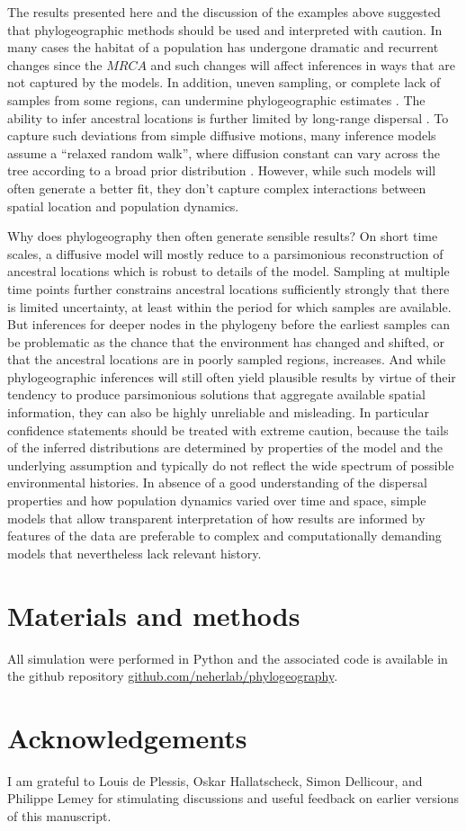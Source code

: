 \documentclass[aps,rmp, twocolumn]{revtex4}
\begin{document}
The results presented here and the discussion of the examples above suggested that phylogeographic methods should be used and interpreted with caution.
In many cases the habitat of a population has undergone dramatic and recurrent changes since the $MRCA$ and such changes will affect inferences in ways that are not captured by the models.
In addition, uneven sampling, or complete lack of samples from some regions, can undermine phylogeographic estimates \citep{kalkauskas_sampling_2021,layan_impact_2023}.
The ability to infer ancestral locations is further limited by long-range dispersal \citep{hallatschek_acceleration_2014}.
To capture such deviations from simple diffusive motions, many inference models assume a ``relaxed random walk'', where diffusion constant can vary across the tree according to a broad prior distribution \citep{dellicour_relax_2021}.
However, while such models will often generate a better fit, they don't capture complex interactions between spatial location and population dynamics.

Why does phylogeography then often generate sensible results?
On short time scales, a diffusive model will mostly reduce to a parsimonious reconstruction of ancestral locations which is robust to details of the model.
Sampling at multiple time points further constrains ancestral locations sufficiently strongly that there is limited uncertainty, at least within the period for which samples are available.
But inferences for deeper nodes in the phylogeny before the earliest samples can be problematic as the chance that the environment has changed and shifted, or that the ancestral locations are in poorly sampled regions, increases.
And while phylogeographic inferences will still often yield plausible results by virtue of their tendency to produce parsimonious solutions that aggregate available spatial information, they can also be highly unreliable and misleading.
In particular confidence statements should be treated with extreme caution, because the tails of the inferred distributions are determined by properties of the model and the underlying assumption and typically do not reflect the wide spectrum of possible environmental histories.
In absence of a good understanding of the dispersal properties and how population dynamics varied over time and space, simple models that allow transparent interpretation of how results are informed by features of the data are preferable to complex and computationally demanding models that nevertheless lack relevant history.

\section*{Materials and methods}
All simulation were performed in Python and the associated code is available in the github repository \href{https://github.com/neherlab/phylogeography}{github.com/neherlab/phylogeography}.

\section*{Acknowledgements}
I am grateful to Louis de Plessis, Oskar Hallatscheck, Simon Dellicour, and Philippe Lemey for stimulating discussions and useful feedback on earlier versions of this manuscript.


\end{document}
